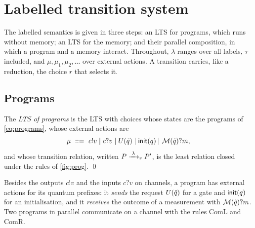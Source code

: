\section{Labelled transition system}\label{sec:lts}

The labelled semantics is given in three steps: an LTS for programs, which
runs without memory; an LTS for the memory; and their parallel composition,
in which a program and a memory interact. Throughout, $\lambda$ ranges over
all labels, $\tau$ included, and $\mu, \mu_1, \mu_2, \ldots$ over external
actions. A transition carries, like a reduction, the choice $r$ that selects
it.

\subsection{Programs}

\begin{definition}\label{def:lts-prog}
The \emph{LTS of \lqCCS programs} is the LTS with choices whose states are the
programs of \eqref{eq:programs}, whose external actions are
\[
\mu \ ::=\ c!v \mid c?v \mid U(\tilde q) \mid \mathsf{init}(q) \mid \mathcal{M}(\tilde q)?m ,
\]
and whose transition relation, written $P \xrightarrow{\;\lambda\;}_{r} P'$, is the
least relation closed under the rules of \cref{fig:prog}.
\qed
\end{definition}

Besides the outputs $c!v$
and the inputs $c?v$ on channels, a program has external actions for its
quantum prefixes: it \emph{sends} the request $U(\tilde q)$ for a gate and
$\mathsf{init}(q)$ for an initialisation, and it \emph{receives} the outcome of a
measurement with $\mathcal{M}(\tilde q)?m$. Two programs in parallel communicate on a
channel with the rules ComL and ComR.

